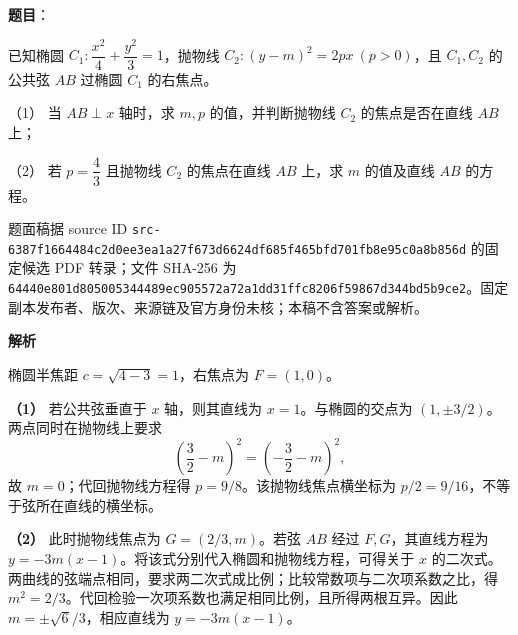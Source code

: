 \begin{answer}

\textbf{题目}：

已知椭圆 $C_1:\dfrac{x^2}{4}+\dfrac{y^2}{3}=1$，抛物线 $C_2:(y-m)^2=2px\ (p>0)$，且 $C_1,C_2$ 的公共弦 $AB$ 过椭圆 $C_1$ 的右焦点。

（1） 当 $AB\perp x$ 轴时，求 $m,p$ 的值，并判断抛物线 $C_2$ 的焦点是否在直线 $AB$ 上；

（2） 若 $p=\dfrac43$ 且抛物线 $C_2$ 的焦点在直线 $AB$ 上，求 $m$ 的值及直线 $AB$ 的方程。

\par\medskip

题面稿据 source ID \texttt{src-6387f1664484c2d0ee3ea1a27f673d6624df685f465bfd701fb8e95c0a8b856d} 的固定候选 PDF 转录；文件 SHA-256 为 \texttt{64440e801d805005344489ec905572a72a1dd31ffc8206f59867d344bd5b9ce2}。固定副本发布者、版次、来源链及官方身份未核；本稿不含答案或解析。

\textbf{解析}

椭圆半焦距 $c=\sqrt{4-3}=1$，右焦点为 $F=(1,0)$。

\textbf{（1）} 若公共弦垂直于 $x$ 轴，则其直线为 $x=1$。与椭圆的交点为 $(1,\pm3/2)$。两点同时在抛物线上要求
\nopagebreak[4]
\[
\left(\frac32-m\right)^2=\left(-\frac32-m\right)^2,
\]
故 $m=0$；代回抛物线方程得 $p=9/8$。该抛物线焦点横坐标为 $p/2=9/16$，不等于弦所在直线的横坐标。

\textbf{（2）} 此时抛物线焦点为 $G=(2/3,m)$。若弦 $AB$ 经过 $F,G$，其直线方程为 $y=-3m(x-1)$。将该式分别代入椭圆和抛物线方程，可得关于 $x$ 的二次式。两曲线的弦端点相同，要求两二次式成比例；比较常数项与二次项系数之比，得 $m^2=2/3$。代回检验一次项系数也满足相同比例，且所得两根互异。因此 $m=\pm\sqrt6/3$，相应直线为 $y=-3m(x-1)$。



\end{answer}